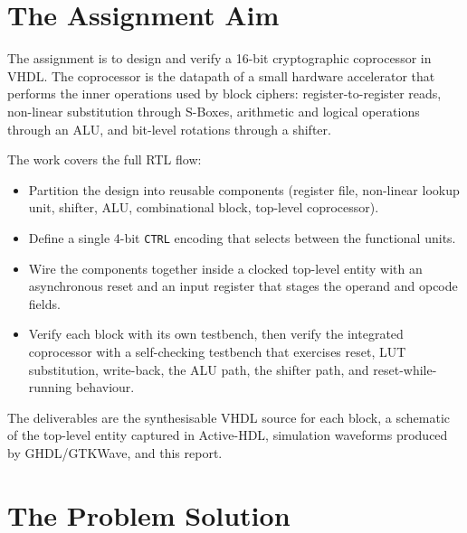 \documentclass[11pt,a4paper]{article}
\begin{document}
\tableofcontents
\newpage

\section{The Assignment Aim}

The assignment is to design and verify a 16-bit cryptographic
coprocessor in VHDL. The coprocessor is the datapath of a small
hardware accelerator that performs the inner operations used by block
ciphers: register-to-register reads, non-linear substitution through
S-Boxes, arithmetic and logical operations through an ALU, and
bit-level rotations through a shifter.

The work covers the full RTL flow:
\begin{itemize}[leftmargin=*]
  \item Partition the design into reusable components (register file,
        non-linear lookup unit, shifter, ALU, combinational block,
        top-level coprocessor).
  \item Define a single 4-bit \texttt{CTRL} encoding that selects
        between the functional units.
  \item Wire the components together inside a clocked top-level entity
        with an asynchronous reset and an input register that stages
        the operand and opcode fields.
  \item Verify each block with its own testbench, then verify the
        integrated coprocessor with a self-checking testbench that
        exercises reset, LUT substitution, write-back, the ALU path,
        the shifter path, and reset-while-running behaviour.
\end{itemize}

The deliverables are the synthesisable VHDL source for each block, a
schematic of the top-level entity captured in Active-HDL, simulation
waveforms produced by GHDL/GTKWave, and this report.

\section{The Problem Solution}
\end{document}
